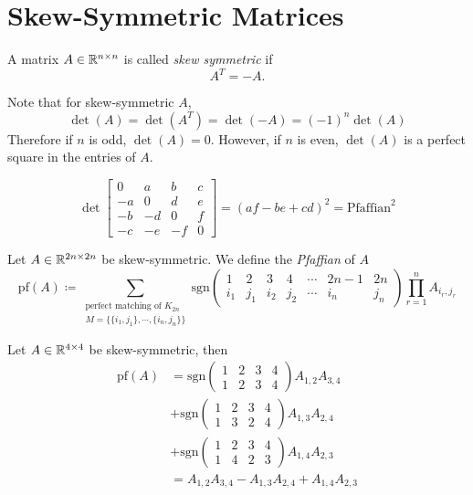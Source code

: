 \section{Skew-Symmetric Matrices}
\begin{definition}
A matrix \(A\in\mathbb{R}^{n\times n}\) is called \emph{skew symmetric} if
\[ A^T=-A. \]
\end{definition}
\begin{remark}
Note that for skew-symmetric \(A\),
\[ \det(A)=\det(A^T)=\det(-A)=(-1)^n\det(A) \]
Therefore if \(n\) is odd, \(\det(A)=0\).
However, if \(n\) is even, \(\det(A)\) is a perfect square in the entries of \(A\).
\end{remark}
\begin{example}
\[ \det\begin{bmatrix}0 & a & b & c \\ -a & 0 & d & e \\ -b & -d & 0 & f \\ -c & -e & -f & 0 \end{bmatrix}=(af-be+cd)^2=\text{Pfaffian}^2 \]
\end{example}
\begin{definition}[Pfaffian]
Let \(A\in\mathbb{R}^{2n\times 2n}\) be skew-symmetric. We define the \emph{Pfaffian} of \(A\)
\[ \mathrm{pf}(A)\coloneqq \sum_{\substack{\text{perfect matching of }K_{2n}\\ M=\{\{i_1,j_1\},\cdots,\{i_n,j_n\}\} }} \mathrm{sgn}\begin{pmatrix} 1&2&3&4&\cdots&2n-1&2n\\ i_1&j_1&i_2&j_2&\cdots&i_n&j_n\end{pmatrix}\prod_{r=1}^n A_{i_r,j_r} \]
\end{definition}
\begin{example}
Let \(A\in\mathbb{R}^{4\times4}\) be skew-symmetric, then
\begin{align*}
    \mathrm{pf}(A)&=\mathrm{sgn}\begin{pmatrix} 1&2&3&4\\ 1&2&3&4\end{pmatrix}A_{1,2}A_{3,4}\\
    &+\mathrm{sgn}\begin{pmatrix} 1&2&3&4\\ 1&3&2&4\end{pmatrix}A_{1,3}A_{2,4}\\
    &+\mathrm{sgn}\begin{pmatrix} 1&2&3&4\\ 1&4&2&3\end{pmatrix}A_{1,4}A_{2,3}\\
    &=A_{1,2}A_{3,4}-A_{1,3}A_{2,4}+A_{1,4}A_{2,3}
\end{align*}
\end{example}
